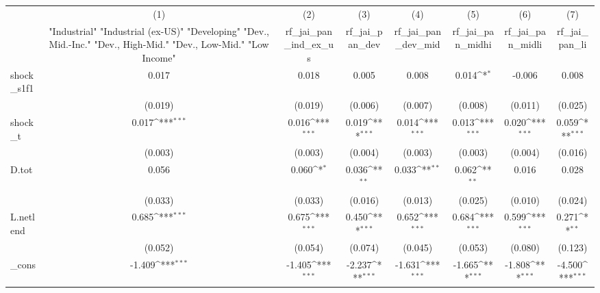 {
\def\sym#1{\ifmmode^{#1}\else\(^{#1}\)\fi}
\begin{tabular}{l*{7}{c}}
\toprule
            &\multicolumn{1}{c}{(1)}&\multicolumn{1}{c}{(2)}&\multicolumn{1}{c}{(3)}&\multicolumn{1}{c}{(4)}&\multicolumn{1}{c}{(5)}&\multicolumn{1}{c}{(6)}&\multicolumn{1}{c}{(7)}\\
            &\multicolumn{1}{c}{ "Industrial" "Industrial (ex-US)" "Developing" "Dev., Mid.-Inc." "Dev., High-Mid."  "Dev., Low-Mid." "Low Income" }&\multicolumn{1}{c}{rf\_jai\_pan\_ind\_ex\_us}&\multicolumn{1}{c}{rf\_jai\_pan\_dev}&\multicolumn{1}{c}{rf\_jai\_pan\_dev\_mid}&\multicolumn{1}{c}{rf\_jai\_pan\_midhi}&\multicolumn{1}{c}{rf\_jai\_pan\_midli}&\multicolumn{1}{c}{rf\_jai\_pan\_li}\\
\midrule
shock\_s1f1  &       0.017         &       0.018         &       0.005         &       0.008         &       0.014\sym{*}  &      -0.006         &       0.008         \\
            &     (0.019)         &     (0.019)         &     (0.006)         &     (0.007)         &     (0.008)         &     (0.011)         &     (0.025)         \\
\addlinespace
shock\_t     &       0.017\sym{***}&       0.016\sym{***}&       0.019\sym{***}&       0.014\sym{***}&       0.013\sym{***}&       0.020\sym{***}&       0.059\sym{***}\\
            &     (0.003)         &     (0.003)         &     (0.004)         &     (0.003)         &     (0.003)         &     (0.004)         &     (0.016)         \\
\addlinespace
D.tot       &       0.056         &       0.060\sym{*}  &       0.036\sym{**} &       0.033\sym{**} &       0.062\sym{**} &       0.016         &       0.028         \\
            &     (0.033)         &     (0.033)         &     (0.016)         &     (0.013)         &     (0.025)         &     (0.010)         &     (0.024)         \\
\addlinespace
L.netlend   &       0.685\sym{***}&       0.675\sym{***}&       0.450\sym{***}&       0.652\sym{***}&       0.684\sym{***}&       0.599\sym{***}&       0.271\sym{**} \\
            &     (0.052)         &     (0.054)         &     (0.074)         &     (0.045)         &     (0.053)         &     (0.080)         &     (0.123)         \\
\addlinespace
\_cons      &      -1.409\sym{***}&      -1.405\sym{***}&      -2.237\sym{***}&      -1.631\sym{***}&      -1.665\sym{***}&      -1.808\sym{***}&      -4.500\sym{***}\\

\end{tabular}}
